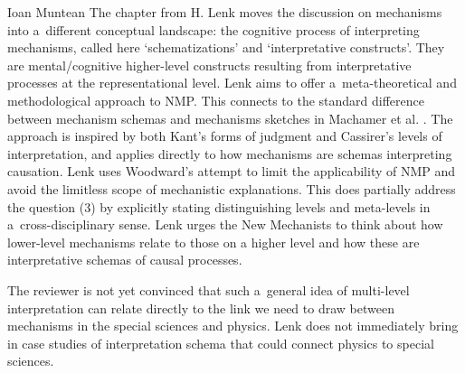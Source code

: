 \begin{recengenv}{Ioan Muntean}
The chapter from H. Lenk moves the discussion on mechanisms into a~different conceptual landscape: the cognitive process of interpreting mechanisms, called here ‘schematizations' and ‘interpretative constructs'. They are mental/cognitive higher-level constructs resulting from interpretative processes at the representational level. Lenk aims to offer a~meta-theoretical and methodological approach to NMP. This connects to the standard difference between mechanism schemas and mechanisms sketches in Machamer et al.
\parencite*[][]{machamer_thinking_2000}. %
 The approach is inspired by both Kant's forms of judgment and Cassirer's levels of interpretation, and applies directly to how mechanisms are schemas interpreting causation. Lenk uses Woodward's 
\parencite*[][]{woodward_mechanistic_2013} %
 attempt to limit the applicability of NMP and avoid the limitless scope of mechanistic explanations. This does partially address the question (3) by explicitly stating distinguishing levels and meta-levels in a~cross-disciplinary sense. Lenk urges the New Mechanists to think about how lower-level mechanisms relate to those on a higher level and how these are interpretative schemas of causal processes.

The reviewer is not yet convinced that such a~general idea of multi-level interpretation can relate directly to the link we need to draw between mechanisms in the special sciences and physics. Lenk does not immediately bring in case studies of interpretation schema that could connect physics to special sciences.


\end{recengenv}
